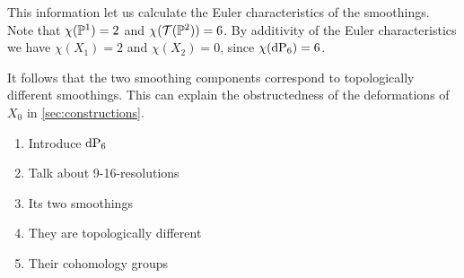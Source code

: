 This information let us calculate the Euler characteristics of the smoothings. Note that $\chi(\P^1)=2$ and $\chi(\mathcal T(\P^2))=6$. By additivity of the Euler characteristics we have $\chi(X_1)=2$ and $\chi(X_2)=0$, since $\chi(\dP6)=6$.

It follows that the two smoothing components correspond to topologically different smoothings. This can explain the obstructedness of the deformations of $X_0$ in \cref{sec:constructions}.


\begin{enumerate}
	\item Introduce $\dP6$
	\item Talk about 9-16-resolutions
	\item Its two smoothings
	\item They are topologically different
	\item Their cohomology groups
\end{enumerate}

